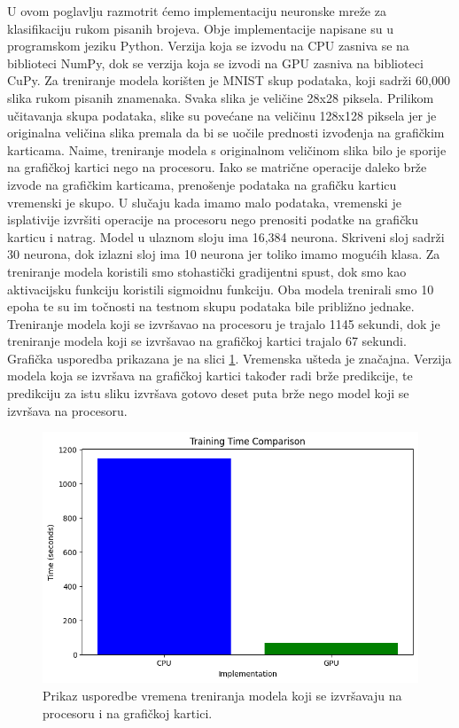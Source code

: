 \documentclass[a4paper,twocolumn]{article}
\begin{document}
	U ovom poglavlju razmotrit ćemo implementaciju neuronske mreže za klasifikaciju rukom pisanih brojeva. Obje implementacije napisane su u programskom jeziku Python. Verzija koja se izvodu na CPU zasniva se na biblioteci NumPy, dok se verzija koja se izvodi na GPU zasniva na biblioteci CuPy. \newline
	Za treniranje modela korišten je MNIST skup podataka, koji sadrži 60,000 slika rukom pisanih znamenaka. Svaka slika je veličine 28x28 piksela. Prilikom učitavanja skupa podataka, slike su povećane na veličinu 128x128 piksela jer je originalna veličina slika premala da bi se uočile prednosti izvođenja na grafičkim karticama. Naime, treniranje modela s originalnom veličinom slika bilo je sporije na grafičkoj kartici nego na procesoru. Iako se matrične operacije daleko brže izvode na grafičkim karticama, prenošenje podataka na grafičku karticu vremenski je skupo. U slučaju kada imamo malo podataka, vremenski je isplativije izvršiti operacije na procesoru nego prenositi podatke na grafičku karticu i natrag. \newline
	Model u ulaznom sloju ima 16,384 neurona. Skriveni sloj sadrži 30 neurona, dok izlazni sloj ima 10 neurona jer toliko imamo mogućih klasa. Za treniranje modela koristili smo stohastički gradijentni spust, dok smo kao aktivacijsku funkciju koristili sigmoidnu funkciju.
	Oba modela trenirali smo 10 epoha te su im točnosti na testnom skupu podataka bile približno jednake. Treniranje modela koji se izvršavao na procesoru je trajalo 1145 sekundi, dok je treniranje modela koji se izvršavao na grafičkoj kartici trajalo 67 sekundi. Grafička usporedba prikazana je na slici \ref{fig:cnn_training_time_comparison}. \newline
	Vremenska ušteda je značajna. Verzija modela koja se izvršava na grafičkoj kartici također radi brže predikcije, te predikciju za istu sliku izvršava gotovo deset puta brže nego model koji se izvršava na procesoru.
	
	\begin{figure}[H]
		\centering
		\includegraphics[width=0.9\linewidth]{slike/cnn_training_time_comparison.png} 
		\caption{Prikaz usporedbe vremena treniranja modela koji se izvršavaju na procesoru i na grafičkoj kartici.}
		\label{fig:cnn_training_time_comparison}
	\end{figure} 
	
\end{document}
